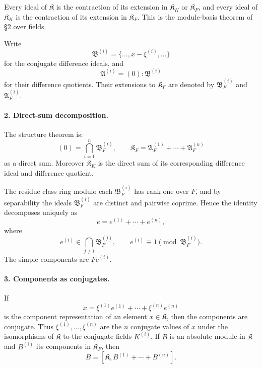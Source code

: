 \documentclass[11pt]{article}
\begin{document}
Every ideal of $\mathfrak K$ is the contraction of its extension in $\mathfrak K_K$ or $\mathfrak K_F$, and every ideal of $\mathfrak K_K$ is the contraction of its extension in $\mathfrak K_F$. This is the module-basis theorem of §2 over fields.

Write
\[
        \mathfrak B^{(i)}=\{\ldots,x-\xi^{(i)},\ldots\}
\]
for the conjugate difference ideals, and
\[
        \mathfrak A^{(i)}=(0):\mathfrak B^{(i)}
\]
for their difference quotients. Their extensions to $\mathfrak K_F$ are denoted by $\mathfrak B_F^{(i)}$ and $\mathfrak A_F^{(i)}$.

\paragraph{2. Direct-sum decomposition.}
The structure theorem is:
\[
        (0)=\bigcap_{i=1}^n \mathfrak B_F^{(i)},
        \qquad
        \mathfrak K_F=\mathfrak A_F^{(1)}+
        \cdots+\mathfrak A_F^{(n)}
\]
as a direct sum. Moreover $\mathfrak K_K$ is the direct sum of its corresponding difference ideal and difference quotient.

The residue class ring modulo each $\mathfrak B_F^{(i)}$ has rank one over $F$, and by separability the ideals $\mathfrak B_F^{(i)}$ are distinct and pairwise coprime. Hence the identity decomposes uniquely as
\[
        e=e^{(1)}+
        \cdots+e^{(n)},
\]
where
\[
        e^{(i)}\in\bigcap_{j\ne i}\mathfrak B_F^{(j)},
        \qquad
        e^{(i)}\equiv1\pmod {\mathfrak B_F^{(i)}}.
\]
The simple components are $Fe^{(i)}$.

\paragraph{3. Components as conjugates.}
If
\[
        x=\xi^{(1)}e^{(1)}+
        \cdots+\xi^{(n)}e^{(n)}
\]
is the component representation of an element $x\in\mathfrak K$, then the components are conjugate. Thus $\xi^{(1)},\ldots,\xi^{(n)}$ are the $n$ conjugate values of $x$ under the isomorphisms of $\mathfrak K$ to the conjugate fields $K^{(i)}$. If $B$ is an absolute module in $\mathfrak K$ and $B^{(i)}$ its components in $\mathfrak K_F$, then
\[
        B=[\mathfrak K,B^{(1)}+\cdots+B^{(n)}].
\]
\end{document}
